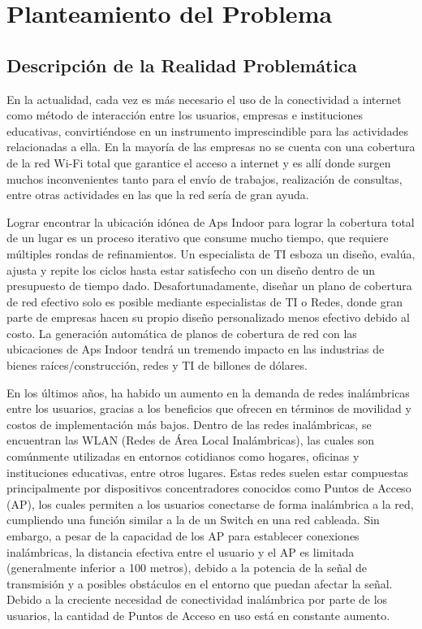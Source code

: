 \chapter{Planteamiento del Problema}
\section{Descripción de la Realidad Problemática}

En la actualidad, cada vez es más necesario el uso de la conectividad a internet como método de interacción entre los usuarios, empresas e instituciones educativas, convirtiéndose en un instrumento imprescindible para las actividades relacionadas a ella. En la mayoría de las empresas no se cuenta con una cobertura de la red Wi-Fi total que garantice el acceso a internet y es allí donde surgen muchos inconvenientes tanto para el envío de trabajos, realización de consultas, entre otras actividades en las que la red sería de gran ayuda.

Lograr encontrar la ubicación idónea de Aps Indoor para lograr la cobertura total de un lugar es un proceso iterativo que consume mucho tiempo, que requiere múltiples rondas de refinamientos. Un especialista de TI esboza un diseño, evalúa, ajusta y repite los ciclos hasta estar satisfecho con un diseño dentro de un presupuesto de tiempo dado. Desafortunadamente, diseñar un plano de cobertura de red efectivo solo es posible mediante especialistas de TI o Redes, donde gran parte de empresas hacen su propio diseño personalizado menos efectivo debido al costo. La generación automática de planos de cobertura de red con las ubicaciones de Aps Indoor tendrá un tremendo impacto en las industrias de bienes raíces/construcción, redes y TI de billones de dólares.

En los últimos años, ha habido un aumento en la demanda de redes inalámbricas entre los usuarios, gracias a los beneficios que ofrecen en términos de movilidad y costos de implementación más bajos. Dentro de las redes inalámbricas, se encuentran las WLAN (Redes de Área Local Inalámbricas), las cuales son comúnmente utilizadas en entornos cotidianos como hogares, oficinas y instituciones educativas, entre otros lugares. Estas redes suelen estar compuestas principalmente por dispositivos concentradores conocidos como Puntos de Acceso (AP), los cuales permiten a los usuarios conectarse de forma inalámbrica a la red, cumpliendo una función similar a la de un Switch en una red cableada. Sin embargo, a pesar de la capacidad de los AP para establecer conexiones inalámbricas, la distancia efectiva entre el usuario y el AP es limitada (generalmente inferior a 100 metros), debido a la potencia de la señal de transmisión y a posibles obstáculos en el entorno que puedan afectar la señal. Debido a la creciente necesidad de conectividad inalámbrica por parte de los usuarios, la cantidad de Puntos de Acceso en uso está en constante aumento.

